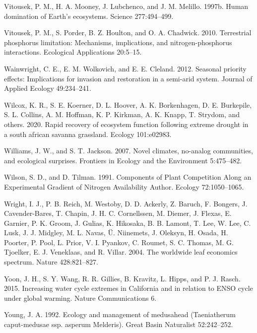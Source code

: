 \documentclass[twoside,12pt,final]{ucthesis-CA2012}
\newlength{\cslhangindent}
\newenvironment{cslreferences}%
  {\setlength{\parindent}{0pt}%
  \everypar{\setlength{\hangindent}{\cslhangindent}}\ignorespaces}%
  {\par}
\begin{document}
\begin{ucmainmatter}
\begin{cslreferences}
\leavevmode\hypertarget{ref-Vitousek1997}{}%
Vitousek, P. M., H. A. Mooney, J. Lubchenco, and J. M. Melillo. 1997b. Human domination of Earth's ecosystems. Science 277:494--499.

\leavevmode\hypertarget{ref-Vitousek2010}{}%
Vitousek, P. M., S. Porder, B. Z. Houlton, and O. A. Chadwick. 2010. Terrestrial phosphorus limitation: Mechanisms, implications, and nitrogen-phosphorus interactions. Ecological Applications 20:5--15.

\leavevmode\hypertarget{ref-Wainwright2012}{}%
Wainwright, C. E., E. M. Wolkovich, and E. E. Cleland. 2012. Seasonal priority effects: Implications for invasion and restoration in a semi-arid system. Journal of Applied Ecology 49:234--241.

\leavevmode\hypertarget{ref-Wilcox2020}{}%
Wilcox, K. R., S. E. Koerner, D. L. Hoover, A. K. Borkenhagen, D. E. Burkepile, S. L. Collins, A. M. Hoffman, K. P. Kirkman, A. K. Knapp, T. Strydom, and others. 2020. Rapid recovery of ecosystem function following extreme drought in a south african savanna grassland. Ecology 101:e02983.

\leavevmode\hypertarget{ref-Williams2007}{}%
Williams, J. W., and S. T. Jackson. 2007. Novel climates, no-analog communities, and ecological surprises. Frontiers in Ecology and the Environment 5:475--482.

\leavevmode\hypertarget{ref-Wilson1991}{}%
Wilson, S. D., and D. Tilman. 1991. Components of Plant Competition Along an Experimental Gradient of Nitrogen Availability Author. Ecology 72:1050--1065.

\leavevmode\hypertarget{ref-Wright2004}{}%
Wright, I. J., P. B. Reich, M. Westoby, D. D. Ackerly, Z. Baruch, F. Bongers, J. Cavender-Bares, T. Chapin, J. H. C. Cornellssen, M. Diemer, J. Flexas, E. Garnier, P. K. Groom, J. Gulias, K. Hikosaka, B. B. Lamont, T. Lee, W. Lee, C. Lusk, J. J. Midgley, M. L. Navas, Ü. Niinemets, J. Oleksyn, H. Osada, H. Poorter, P. Pool, L. Prior, V. I. Pyankov, C. Roumet, S. C. Thomas, M. G. Tjoelker, E. J. Veneklaas, and R. Villar. 2004. The worldwide leaf economics spectrum. Nature 428:821--827.

\leavevmode\hypertarget{ref-Yoon2015}{}%
Yoon, J. H., S. Y. Wang, R. R. Gillies, B. Kravitz, L. Hipps, and P. J. Rasch. 2015. Increasing water cycle extremes in California and in relation to ENSO cycle under global warming. Nature Communications 6.

\leavevmode\hypertarget{ref-Young1992}{}%
Young, J. A. 1992. Ecology and management of medusahead (Taeniatherum caput-medusae ssp. asperum Melderis). Great Basin Naturalist 52:242--252.


\end{cslreferences}
\end{ucmainmatter}
\end{document}
